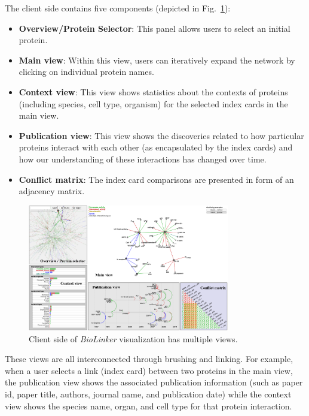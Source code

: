 \documentclass[journal]{vgtc}                %
\newcommand{\theName}{\textit{BioLinker}}
\begin{document}
The client side contains five components (depicted in Fig.~\ref{fig:BioLinkerOverview}): 
\begin{itemize}[noitemsep,nolistsep]
\item \textbf{Overview/Protein Selector}: This panel allows users to select an initial protein.
\item \textbf{Main view}: Within this view, users can iteratively expand the network by clicking on individual protein names. %
\item \textbf{Context view}: This view shows statistics about the contexts of proteins (including species, cell type, organism) for the selected index cards in the main view.  %
\item \textbf{Publication view}: This view shows the discoveries related to how particular proteins interact with each other (as encapsulated by the index cards) and how our understanding of these interactions has changed over time.  %
\item \textbf{Conflict matrix}: The index card comparisons are presented in form of an adjacency matrix. %
\end{itemize}

\begin{figure}[h!]
  \centering
  \includegraphics[width=250pt]{figures/Figure1.png}
  \caption{Client side of \theName{} visualization has multiple views.}
  \label{fig:BioLinkerOverview}
\end{figure}

These views are all interconnected through brushing and linking. For example, when a user selects a link (index card) between two proteins in the main view, the publication view shows the associated publication information (such as paper id, paper title, authors, journal name, and publication date) while the context view shows the species name, organ, and cell type for that protein interaction. 
\end{document}

